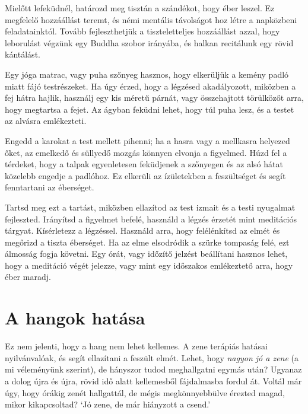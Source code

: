 \clearpage
\null\thispagestyle{empty}%
%
%
\label{illus-lying-down-meditation}%
\clearpage

Mielőtt lefeküdnél, határozd meg tisztán a szándékot, hogy éber leszel.
Ez megfelelő hozzáállást teremt, és némi mentális távolságot hoz létre a
napközbeni feladatainktól. Tovább fejleszthetjük a tiszteletteljes
hozzáállást azzal, hogy leborulást végzünk egy Buddha szobor irányába,
és halkan recitálunk egy rövid kántálást.

Egy jóga matrac, vagy puha szőnyeg hasznos, hogy elkerüljük a kemény
padló miatt fájó testrészeket. Ha úgy érzed, hogy a légzésed
akadályozott, miközben a fej hátra hajlik, használj egy kis méretű
párnát, vagy összehajtott törülközőt arra, hogy megtartsa a fejet. Az
ágyban feküdni lehet, hogy túl puha lesz, és a testet az alvásra
emlékezteti.

Engedd a karokat a test mellett pihenni; ha a hasra vagy a mellkasra
helyezed őket, az emelkedő és süllyedő mozgás könnyen elvonja a
figyelmed. Húzd fel a térdeket, hogy a talpak egyenletesen feküdjenek a
szőnyegen és az alsó hátat közelebb engedje a padlóhoz. Ez elkerüli az
ízületekben a feszültséget és segít fenntartani az éberséget.

Tartsd meg ezt a tartást, miközben ellazítod az test izmait és a testi
nyugalmat fejleszted. Irányítsd a figyelmet befelé, használd a légzés
érzetét mint meditációs tárgyat. Kísérletezz a légzéssel. Használd arra,
hogy felélénkítsd az elmét és megőrizd a tiszta éberséget. Ha az elme
elsodródik a szürke tompaság felé, ezt álmosság fogja követni. Egy órát,
vagy időzítő jelzést beállítani hasznos lehet, hogy a meditáció végét jelezze,
vagy mint egy időszakos emlékeztető arra, hogy éber maradj.

\clearpage

\section{A hangok hatása}


\noindent Ez nem jelenti, hogy a hang nem lehet kellemes. A zene
terápiás hatásai nyilvánvalóak, és segít ellazítani a feszült elmét.
Lehet, hogy \emph{nagyon jó a zene} (a mi véleményünk szerint), de
hányszor tudod meghallgatni egymás után? Ugyanaz a dolog újra és újra,
rövid idő alatt kellemesből fájdalmasba fordul át. Voltál már úgy, hogy
órákig zenét hallgattál, de mégis megkönnyebbülve érezted magad, mikor
kikapcsoltad? `Jó zene, de már hiányzott a csend.'


